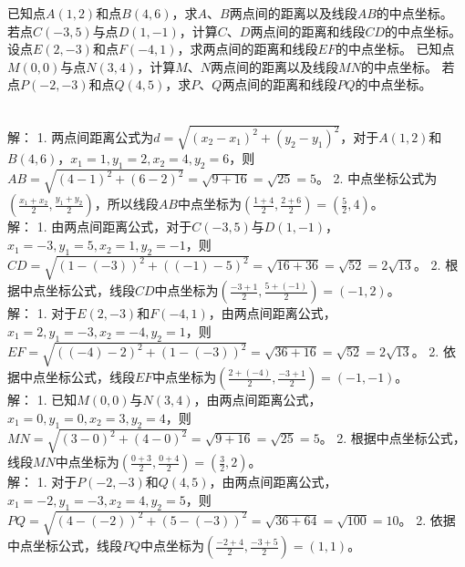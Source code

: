 \documentclass{ctexart}
\newenvironment{MyAnswer}[1][] %
{
    \begin{tcolorbox}[breakable, colframe=blue]
    \begin{Answer}[#1] \color{blue} \kaishu
        }  %
    {\end{Answer}
\end{tcolorbox}
}
\begin{document}
\begin{Exercise}[title={两点间距离与中点坐标计算练习}, label={ex:distance_midpoint}]
    \Question 已知点\(A(1, 2)\)和点\(B(4, 6)\)，求\(A\)、\(B\)两点间的距离以及线段\(AB\)的中点坐标。
    \Question 若点\(C(-3, 5)\)与点\(D(1, -1)\)，计算\(C\)、\(D\)两点间的距离和线段\(CD\)的中点坐标。
    \Question 设点\(E(2, -3)\)和点\(F(-4, 1)\)，求两点间的距离和线段\(EF\)的中点坐标。
    \Question 已知点\(M(0, 0)\)与点\(N(3, 4)\)，计算\(M\)、\(N\)两点间的距离以及线段\(MN\)的中点坐标。
    \Question 若点\(P(-2, -3)\)和点\(Q(4, 5)\)，求\(P\)、\(Q\)两点间的距离和线段\(PQ\)的中点坐标。
\end{Exercise}
\begin{MyAnswer}[ref={ex:distance_midpoint}]
    \Question 
        \\
        解：
        1. 两点间距离公式为\(d = \sqrt{(x_2 - x_1)^2+(y_2 - y_1)^2}\)，对于\(A(1, 2)\)和\(B(4, 6)\)，\(x_1 = 1,y_1 = 2,x_2 = 4,y_2 = 6\)，则\(AB=\sqrt{(4 - 1)^2+(6 - 2)^2}=\sqrt{9 + 16}=\sqrt{25}=5\)。
        2. 中点坐标公式为\((\frac{x_1 + x_2}{2},\frac{y_1 + y_2}{2})\)，所以线段\(AB\)中点坐标为\((\frac{1 + 4}{2},\frac{2 + 6}{2}) = (\frac{5}{2}, 4)\)。
    \Question 
        \\
        解：
        1. 由两点间距离公式，对于\(C(-3, 5)\)与\(D(1, -1)\)，\(x_1=-3,y_1 = 5,x_2 = 1,y_2=-1\)，则\(CD=\sqrt{(1 - (-3))^2+((-1)-5)^2}=\sqrt{16 + 36}=\sqrt{52}=2\sqrt{13}\)。
        2. 根据中点坐标公式，线段\(CD\)中点坐标为\((\frac{-3 + 1}{2},\frac{5 + (-1)}{2})=(-1, 2)\)。
    \Question 
        \\
        解：
        1. 对于\(E(2, -3)\)和\(F(-4, 1)\)，由两点间距离公式，\(x_1 = 2,y_1=-3,x_2=-4,y_2 = 1\)，则\(EF=\sqrt{((-4)-2)^2+(1 - (-3))^2}=\sqrt{36 + 16}=\sqrt{52}=2\sqrt{13}\)。
        2. 依据中点坐标公式，线段\(EF\)中点坐标为\((\frac{2 + (-4)}{2},\frac{-3 + 1}{2})=(-1, -1)\)。
    \Question 
        \\
        解：
        1. 已知\(M(0, 0)\)与\(N(3, 4)\)，由两点间距离公式，\(x_1 = 0,y_1 = 0,x_2 = 3,y_2 = 4\)，则\(MN=\sqrt{(3 - 0)^2+(4 - 0)^2}=\sqrt{9 + 16}=\sqrt{25}=5\)。
        2. 根据中点坐标公式，线段\(MN\)中点坐标为\((\frac{0 + 3}{2},\frac{0 + 4}{2})=(\frac{3}{2}, 2)\)。
    \Question 
        \\
        解：
        1. 对于\(P(-2, -3)\)和\(Q(4, 5)\)，由两点间距离公式，\(x_1=-2,y_1=-3,x_2 = 4,y_2 = 5\)，则\(PQ=\sqrt{(4 - (-2))^2+(5 - (-3))^2}=\sqrt{36 + 64}=\sqrt{100}=10\)。
        2. 依据中点坐标公式，线段\(PQ\)中点坐标为\((\frac{-2 + 4}{2},\frac{-3 + 5}{2})=(1, 1)\)。
\end{MyAnswer}
\end{document}
